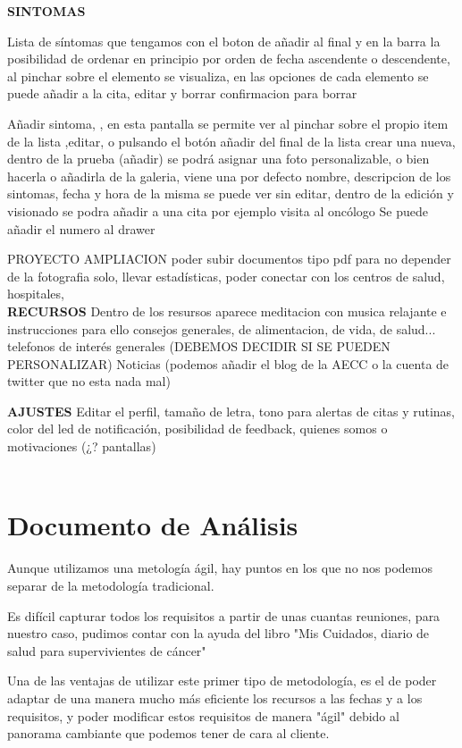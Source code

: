\documentclass[../pfc.tex]{subfiles}
\begin{document}
	
	\textbf{SINTOMAS}
	
	Lista de síntomas que tengamos con el boton de añadir al final y en la barra la posibilidad de ordenar en principio por orden de fecha ascendente o descendente,
	al pinchar sobre el elemento se visualiza, 
	en las opciones de cada elemento se puede añadir a la cita, editar y borrar confirmacion para borrar
	
	Añadir sintoma, , en esta pantalla se permite ver al pinchar sobre el propio item de la lista ,editar, o pulsando el botón añadir del final de la lista crear una nueva, 
	dentro de la prueba (añadir) se podrá asignar una foto personalizable, o bien hacerla o añadirla de la galeria, viene una por defecto
	nombre, descripcion de los sintomas,
	fecha y hora de la misma
	se puede ver sin editar, dentro de la edición y visionado se podra añadir a una cita por ejemplo visita al oncólogo
	Se puede añadir el numero al drawer
	
	PROYECTO AMPLIACION poder subir documentos tipo pdf para no depender de la fotografia solo, llevar estadísticas, poder conectar con los centros de salud, hospitales, \\
	
	
	\textbf{RECURSOS}
	Dentro de los resursos aparece meditacion con musica relajante e instrucciones para ello
	consejos generales, de alimentacion, de vida, de salud...
	telefonos de interés generales (DEBEMOS DECIDIR SI SE PUEDEN PERSONALIZAR)
	Noticias (podemos añadir el blog de la AECC o la cuenta de twitter que no esta nada mal)
	
	
	\textbf{AJUSTES}
	Editar el perfil, 
	tamaño de letra, 	
	tono para alertas de citas y rutinas, 
	color del led de notificación, 
	posibilidad de feedback,
	quienes somos o motivaciones (¿? pantallas)\\\\

	
	\section{Documento de Análisis}
	
	Aunque utilizamos una metología ágil, hay puntos en los que no nos podemos separar de la metodología tradicional.
			
	Es difícil capturar todos los requisitos a partir de unas cuantas reuniones, para nuestro caso, pudimos contar con la ayuda del libro "Mis Cuidados, diario de salud para supervivientes de cáncer"
			
	Una de las ventajas de utilizar este primer tipo de metodología, es el de poder adaptar de una manera mucho más eficiente los recursos a las fechas y a los requisitos, y poder modificar estos requisitos de manera "ágil" debido al panorama cambiante que podemos tener de cara al cliente.
			
\end{document}
